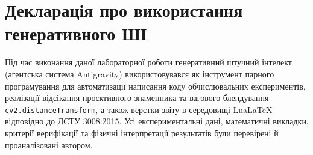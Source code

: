 \documentclass[14pt, a4paper]{extarticle}
\begin{document}
\section{Декларація про використання генеративного ШІ}
Під час виконання даної лабораторної роботи генеративний штучний інтелект (агентська система Antigravity) використовувався як інструмент парного програмування для автоматизації написання коду обчислювальних експериментів, реалізації відсікання проєктивного знаменника та вагового блендування \texttt{cv2.distanceTransform}, а також верстки звіту в середовищі LuaLaTeX відповідно до ДСТУ 3008:2015. Усі експериментальні дані, математичні викладки, критерії верифікації та фізичні інтерпретації результатів були перевірені й проаналізовані автором.
\end{document}
